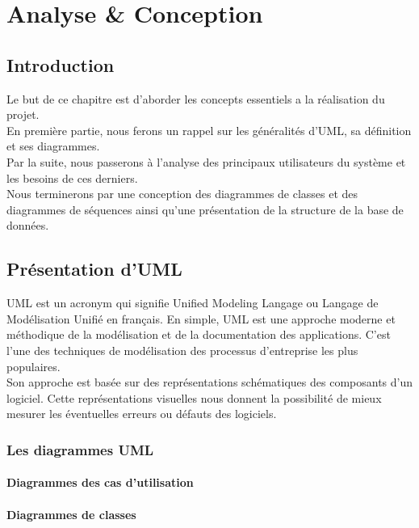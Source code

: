 \chapter{Analyse \& Conception}

\section{Introduction}
Le but de ce chapitre est d'aborder les concepts essentiels a la réalisation du projet.\\

En première partie, nous ferons un rappel sur les généralités d'UML, sa définition et ses diagrammes.\\

Par la suite, nous passerons à l'analyse des principaux utilisateurs du système et les besoins de ces derniers.\\

Nous terminerons par une conception des diagrammes de classes et des diagrammes de séquences ainsi qu'une présentation de la structure de la base de données.\\

\section{Présentation d'\acs{UML}}
    \acs{UML} est un acronym qui signifie Unified Modeling Langage ou Langage de Modélisation Unifié en français. En simple, \acs{UML} est une approche moderne et méthodique de la modélisation et de la documentation des applications. C'est l'une des techniques de modélisation des processus d'entreprise les plus populaires.\\
    
    Son approche est basée sur des représentations schématiques des composants d'un logiciel. Cette représentations visuelles nous donnent la possibilité de mieux mesurer les éventuelles erreurs ou défauts des logiciels.\\

    \subsection{Les diagrammes \acs{UML}}
        \subsubsection{Diagrammes des cas d'utilisation}
        \subsubsection{Diagrammes de classes}

